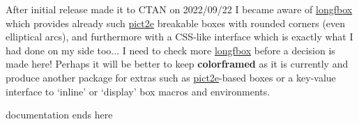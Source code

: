 \documentclass[a4paper,dvipdfmx,10pt,english]{article}
\def\ctanpackage#1{\href{https://ctan.org/pkg/#1}{#1}}
\newcommand\colorframed{%
        \texorpdfstring{{\color{joli}\bfseries colorframed}}{colorframed}\xspace}
\begin{document}
\thispagestyle{empty}
\enlargethispage{2\baselineskip}

\footnotesize
\begin{snugshade}
  After initial release made it to CTAN on
  2022/09/22 I became aware of \ctanpackage{longfbox} which
  provides already such \ctanpackage{pict2e} breakable boxes with
  rounded corners (even elliptical arcs), and furthermore with a
  CSS-like interface which is exactly what I had done on my side
  too... I need to check more \ctanpackage{longfbox} before a
  decision is made here!  Perhaps it will be better to keep
  \colorframed as it is currently and produce another package for
  extras such as \ctanpackage{pict2e}-based boxes or a key-value
  interface to `inline' or `display' box macros and environments.
\end{snugshade}
\centerline{\hrulefill documentation ends here\hrulefill}
\end{document}

